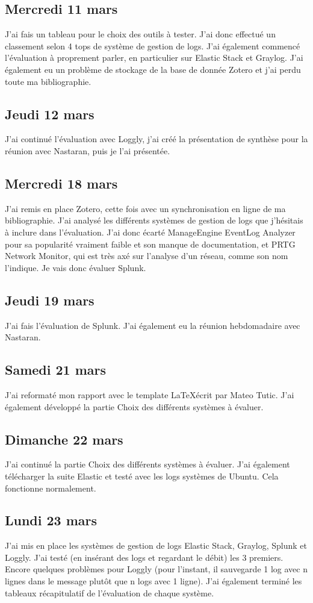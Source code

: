 \documentclass[paper=a4, fontsize=11pt]{scrartcl}
\begin{document}
\subsection{Mercredi 11 mars}
    J'ai fais un tableau pour le choix des outils à tester. J'ai donc effectué un classement selon 4 tops de système de gestion de logs.
    J'ai également commencé l'évaluation à proprement parler, en particulier sur Elastic Stack et Graylog. J'ai également eu un problème de stockage de la base de donnée Zotero et j'ai perdu toute ma bibliographie.
\subsection{Jeudi 12 mars}
    J'ai continué l'évaluation avec Loggly, j'ai créé la présentation de synthèse pour la réunion avec Nastaran, puis je l'ai présentée.
\subsection{Mercredi 18 mars}
    J'ai remis en place Zotero, cette fois avec un synchronisation en ligne de ma bibliographie. J'ai analysé les différents systèmes de gestion de logs que j'hésitais à inclure dans l'évaluation. J'ai donc écarté ManageEngine EventLog Analyzer pour sa popularité vraiment faible et son manque de documentation, et PRTG Network Monitor, qui est très axé sur l'analyse d'un réseau, comme son nom l'indique. Je vais donc évaluer Splunk.
\subsection{Jeudi 19 mars}
    J'ai fais l'évaluation de Splunk. J'ai également eu la réunion hebdomadaire avec Nastaran.
\subsection{Samedi 21 mars}
    J'ai reformaté mon rapport avec le template \LaTeX écrit par Mateo Tutic. J'ai également développé la partie Choix des différents systèmes à évaluer.
\subsection{Dimanche 22 mars}
    J'ai continué la partie Choix des différents systèmes à évaluer. J'ai également télécharger la suite Elastic et testé avec les logs systèmes de Ubuntu. Cela fonctionne normalement.
\subsection{Lundi 23 mars}
    J'ai mis en place les systèmes de gestion de logs Elastic Stack, Graylog, Splunk et Loggly. J'ai testé (en insérant des logs et regardant le débit) les 3 premiers. Encore quelques problèmes pour Loggly (pour l'instant, il sauvegarde 1 log avec n lignes dans le message plutôt que n logs avec 1 ligne). J'ai également terminé les tableaux récapitulatif de l'évaluation de chaque système.
\end{document}
